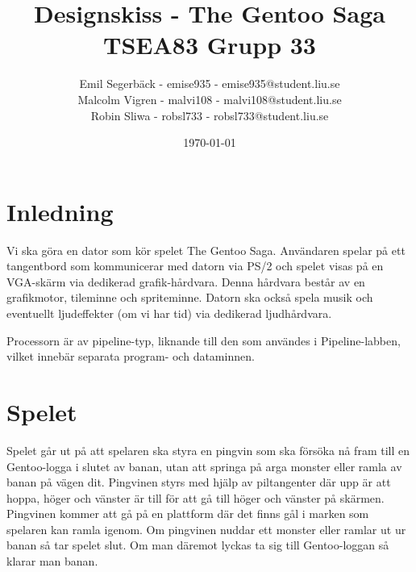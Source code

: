 \documentclass[a4paper,titlepage]{article}
\title{
\textbf{Designskiss - The Gentoo Saga} \\
\large TSEA83 Grupp 33}
\date{\today}
\author{
        Emil Segerbäck - emise935 - emise935@student.liu.se\\
		Malcolm Vigren - malvi108 - malvi108@student.liu.se \\
		Robin Sliwa - robsl733 - robsl733@student.liu.se}
\begin{document}
    \maketitle
    \newpage
\tableofcontents
    \newpage

\section{Inledning}
Vi ska göra en dator som kör spelet The Gentoo Saga. Användaren spelar på ett
tangentbord som kommunicerar med datorn via PS/2 och spelet visas på en
VGA-skärm via dedikerad grafik-hårdvara. Denna hårdvara består av en
grafikmotor, tileminne och spriteminne. Datorn ska också spela musik och
eventuellt ljudeffekter (om vi har tid) via dedikerad ljudhårdvara.

Processorn är av pipeline-typ, liknande till den som användes i
Pipeline-labben, vilket innebär separata program- och dataminnen. 

\section{Spelet}
Spelet går ut på att spelaren ska styra en pingvin som ska försöka nå fram till
en Gentoo-logga i slutet av banan, utan att springa på arga monster eller
ramla av banan på vägen dit. Pingvinen styrs med hjälp av piltangenter där upp
är att hoppa, höger och vänster är till för att gå till höger och vänster på
skärmen. Pingvinen kommer att gå på en plattform där det finns gål i marken som
spelaren kan ramla igenom. Om pingvinen nuddar ett monster eller ramlar ut ur
banan så tar spelet slut. Om man däremot lyckas ta sig till Gentoo-loggan så
klarar man banan.  
\end{document}
